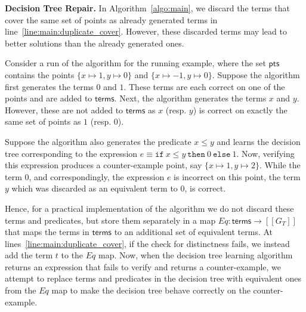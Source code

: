 \documentclass{llncs}
\newcommand\Equiv{\mathit{Eq}}
\newcommand\Points{\mathsf{pts}}
\newcommand\Expr{e}
\newcommand\Terms{\mathsf{terms}}
\newcommand\Term{t}
\newcommand\Grammar{G}
\newcommand\sem[1]{[\![ #1 ]\!]}
\renewcommand{\paragraph}[1]{\par\noindent\textbf{#1.}}
\begin{document}
\paragraph{Decision Tree Repair}
In Algorithm~\ref{algo:main}, we discard the terms that cover the same
set of points as already generated terms in
line~\ref{line:main:duplicate_cover}.
However, these discarded terms may lead to better solutions than the
already generated ones.

\begin{example}
  \label{ex:dt_repair}
  Consider a run of the algorithm for the running
  example, where the set $\Points$ contains the points $\{ x \mapsto 1,
  y \mapsto 0 \}$ and $\{ x \mapsto -1, y \mapsto 0 \}$.
  Suppose the algorithm first generates the terms $0$ and $1$.
  These terms are each correct on one of the points and are added to
  $\Terms$.
  Next, the algorithm generates the terms $x$ and $y$.
  However, these are not added to $\Terms$ as $x$ (resp. $y$) is correct
  on exactly the same set of points as $1$ (resp. $0$).

  Suppose the algorithm also generates the predicate $x \leq y$ and
  learns the decision tree corresponding to the expression $\Expr \equiv
  \mathtt{if}~x \leq y~\mathtt{then}~0~\mathtt{else}~1$.
  Now, verifying this expression produces a counter-example point, say
  $\{ x \mapsto 1, y \mapsto 2 \}$.
  While the term $0$, and correspondingly, the expression $\Expr$ is
  incorrect on this point, the term $y$ which was discarded as an
  equivalent term to $0$, is correct.
\end{example}

Hence, for a practical implementation of the algorithm we do not discard
these terms and predicates, but store them separately in a map $\Equiv :
\Terms \to \sem{\Grammar_T}$ that maps the terms in
$\Terms$ to an additional set of equivalent terms.
At lines~\ref{line:main:duplicate_cover}, if the check for distinctness
fails, we instead add the term $\Term$ to the $\Equiv$ map.
Now, when the decision tree learning algorithm returns an expression
that fails to verify and returns a counter-example, we attempt to
replace terms and predicates in the decision tree with equivalent ones
from the $\Equiv$ map to make the decision tree behave correctly on the
counter-example.
\end{document}
